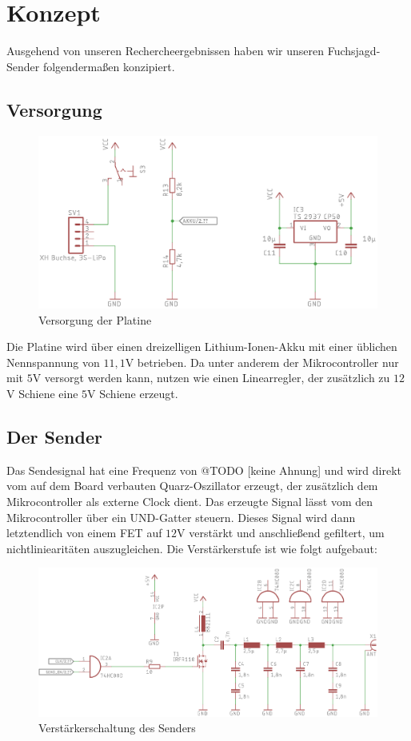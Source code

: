 \section{Konzept}
Ausgehend von unseren Rechercheergebnissen haben wir unseren Fuchsjagd-Sender
folgendermaßen konzipiert.
\subsection{Versorgung}
\begin{figure}[H]
    \centering
    \includegraphics{res/Versorgung.png}
    \caption{Versorgung der Platine}
\end{figure}
Die Platine wird über einen dreizelligen Lithium-Ionen-Akku mit einer üblichen Nennspannung
von $11,1$V betrieben. Da unter anderem der Mikrocontroller nur mit $5$V versorgt
werden kann, nutzen wie einen Linearregler, der zusätzlich zu $12$V Schiene eine
$5$V Schiene erzeugt.

\subsection{Der Sender}
Das Sendesignal hat eine Frequenz von @TODO [keine Ahnung] und wird direkt vom auf dem Board
verbauten Quarz-Oszillator erzeugt, der zusätzlich dem Mikrocontroller als externe Clock
dient. Das erzeugte Signal lässt vom den Mikrocontroller über ein UND-Gatter steuern. Dieses
Signal wird dann letztendlich von einem FET auf $12$V verstärkt und anschließend gefiltert,
um nichtliniearitäten auszugleichen. Die Verstärkerstufe ist wie folgt aufgebaut:

\begin{figure}[H]
    \includegraphics{res/Endstufe.png}
    \caption{Verstärkerschaltung des Senders}
\end{figure}

